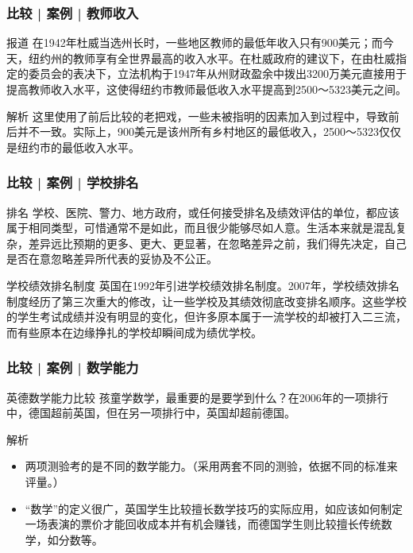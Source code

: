 \begin{frame}
  \frametitle{比较 | 案例 | 教师收入}
  \begin{block}{报道}
    在1942年杜威当选州长时，一些地区教师的最低年收入只有900美元；而今天，纽约州的教师享有全世界最高的收入水平。在杜威政府的建议下，在由杜威指定的委员会的表决下，立法机构于1947年从州财政盈余中拨出3200万美元直接用于提高教师收入水平，这使得纽约市教师最低收入水平提高到2500～5323美元之间。
  \end{block}
  \pause \pause \pause \pause
  \begin{block}{解析}
    这里使用了前后比较的老把戏，一些未被指明的因素加入到过程中，导致前后并不一致。实际上，900美元是该州所有乡村地区的最低收入，2500～5323仅仅是纽约市的最低收入水平。
  \end{block}
\end{frame}

\begin{frame}
  \frametitle{比较 | 案例 | 学校排名}
  \begin{block}{排名}
    学校、医院、警力、地方政府，或任何接受排名及绩效评估的单位，都应该属于相同类型，可惜通常不是如此，而且很少能够尽如人意。生活本来就是混乱复杂，差异远比预期的更多、更大、更显著，在忽略差异之前，我们得先决定，自己是否在意忽略差异所代表的妥协及不公正。
  \end{block}
  \pause
  \begin{block}{学校绩效排名制度}
    英国在1992年引进学校绩效排名制度。2007年，学校绩效排名制度经历了第三次重大的修改，让一些学校及其绩效彻底改变排名顺序。这些学校的学生考试成绩并没有明显的变化，但许多原本属于一流学校的却被打入二三流，而有些原本在边缘挣扎的学校却瞬间成为绩优学校。
  \end{block}
\end{frame}

\begin{frame}
  \frametitle{比较 | 案例 | 数学能力}
  \begin{block}{英德数学能力比较}
    孩童学数学，最重要的是要学到什么？在2006年的一项排行中，德国超前英国，但在另一项排行中，英国却超前德国。
  \end{block}
  \pause \pause \pause \pause
  \begin{block}{解析}
    \begin{itemize}
      \item 两项测验考的是不同的数学能力。（采用两套不同的测验，依据不同的标准来评量。）
      \item “数学”的定义很广，英国学生比较擅长数学技巧的实际应用，如应该如何制定一场表演的票价才能回收成本并有机会赚钱，而德国学生则比较擅长传统数学，如分数等。
    \end{itemize}
  \end{block}
\end{frame}

